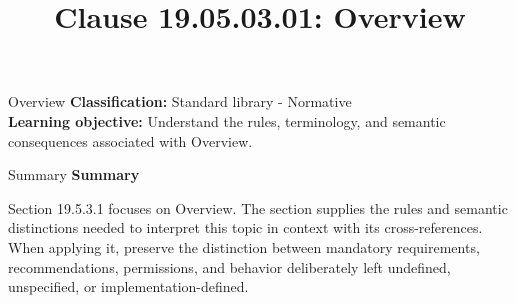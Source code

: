 \documentclass[10pt,letterpaper]{article}
\title{Clause 19.05.03.01: Overview}
\author{}
\date{}
\begin{document}
\maketitle
\begin{CornellOverviewBox}{Overview}
\textbf{Classification:} Standard library - Normative\\[2pt]
\textbf{Learning objective:} Understand the rules, terminology, and semantic consequences associated with Overview.
\end{CornellOverviewBox}\begin{CornellSummaryBox}{Summary}
{\sffamily\bfseries\color{Accent} Summary}\par\vspace{3pt}Section 19.5.3.1 focuses on Overview. The section supplies the rules and semantic distinctions needed to interpret this topic in context with its cross-references. When applying it, preserve the distinction between mandatory requirements, recommendations, permissions, and behavior deliberately left undefined, unspecified, or implementation-defined.
\end{CornellSummaryBox}
\end{document}
